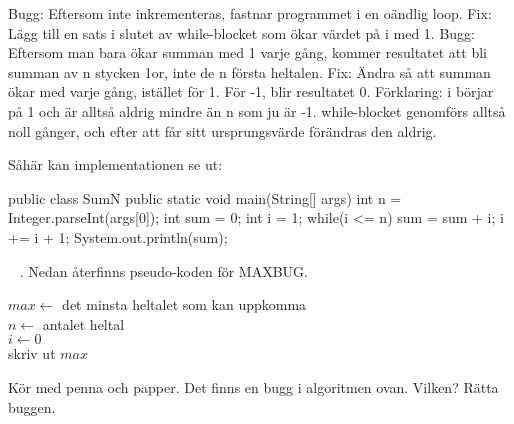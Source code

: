 \SOLUTION


\TaskSolved \what


\SubtaskSolved  Bugg: Eftersom  inte inkrementeras, fastnar programmet i en oändlig loop. Fix: Lägg till en sats i slutet av while-blocket som ökar värdet på i med 1.
Bugg: Eftersom man bara ökar summan med 1 varje gång, kommer resultatet att bli summan av n stycken 1or, inte de n första heltalen. Fix: Ändra så att summan ökar med  varje gång, istället för 1.
För -1, blir resultatet 0. Förklaring: i börjar på 1 och är alltså aldrig mindre än n som ju är -1. while-blocket genomförs alltså noll gånger, och efter att  får sitt ursprungsvärde förändras den aldrig.


\SubtaskSolved  Såhär kan implementationen se ut:
\begin{Code}
public class SumN {
  public static void main(String[] args) {
    int n = Integer.parseInt(args[0]);
    int sum = 0;
    int i = 1;
    while(i <= n){
      sum = sum + i;
      i += i + 1;
      }
    }
    System.out.println(sum);
}
\end{Code}

\QUESTEND






\clearpage

\ExtraTasks %





\QUESTBEGIN

\Task  \what~ . Nedan återfinns pseudo-koden för MAXBUG.

\begin{algorithm}[H]

 $max \leftarrow$ det minsta heltalet som kan uppkomma  \\
 $n \leftarrow $ antalet heltal \\
 $i \leftarrow 0$ \\
 skriv ut $max$
\end{algorithm}

\Subtask Kör med penna och papper. Det finns en bugg i algoritmen ovan. Vilken? Rätta buggen.

